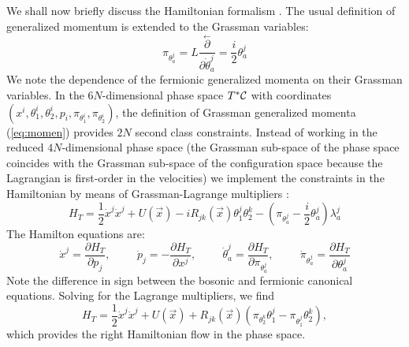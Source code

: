 \documentclass[a4paper,11pt,twoside]{article}
\begin{document}
We shall now briefly discuss the Hamiltonian formalism \cite{Ju}.
The usual definition of generalized momentum is extended to the
Grassman variables:
\begin{equation}
\pi_{\theta_a^j}= L
\frac{\stackrel{\leftarrow}{\partial}}{\partial \dot{\theta}_a^j}=
\frac{i}{2} \theta_a^j
\label{eq:momen}
\end{equation}
We note the dependence of the fermionic generalized momenta on
their Grassman variables. In the $6N$-dimensional phase space
$T^*{\cal C}$ with coordinates $(x^i,\theta_1^i,\theta_2^i,p_i,
\pi_{\theta_1^i},\pi_{\theta_2^i})$, the definition of Grassman
generalized momenta (\ref{eq:momen}) provides $2N$ second class
constraints. Instead of working in the reduced $4N$-dimensional
phase space (the Grassman sub-space of the phase space coincides
with the Grassman sub-space of the configuration space because the
Lagrangian is first-order in the velocities) we implement the
constraints in the Hamiltonian by means of Grassman-Lagrange
multipliers \cite{Di}:
\[
H_T=\displaystyle\frac{1}{2} \dot{x}^j \dot{x}^j +U(\vec{x})- i
R_{jk}(\vec{x}) \theta^j_1
\theta^k_2-(\pi_{\theta_a^j}-\displaystyle\frac{i}{2}
\theta_a^j) \lambda_a^j
\]
The Hamilton equations are:
\[
\dot{x}^j=\displaystyle\frac{\partial H_T}{\partial p_j}, \hspace{1cm} \dot{p}_j=-\displaystyle\frac{\partial H_T}{\partial x^j}, \hspace{1cm}  \dot{\theta}_a^j=\displaystyle\frac{\partial
H_T}{\partial \displaystyle\pi_{\theta_a^j}},
\hspace{1cm}
\dot{\pi}_{\theta_a^j}=\displaystyle\frac{\partial H_T}{\partial
\theta_a^j}
\]
Note the difference in sign between the bosonic and fermionic
canonical equations. Solving for the Lagrange multipliers, we find
\[
H_T=\frac{1}{2} \dot{x}^j \dot{x}^j +U(\vec{x})+ R_{jk}(\vec{x})
(\pi_{\theta_2^k} \theta_1^j-\pi_{\theta_1^j} \theta_2^k) ,
\]
which provides the right Hamiltonian flow in the phase space.
\end{document}
